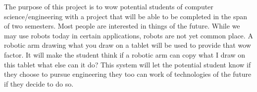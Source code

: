 The purpose of this project is to wow potential students of computer science/engineering with a project that will be able to be completed in the span of two semesters. Most people are interested in things of the future. While we may use robots today in certain applications, robots are not yet common place. A robotic arm drawing what you draw on a tablet will be used to provide that wow factor. It will make the student think if a robotic arm can copy what I draw on this tablet what else can it do? This system will let the potential student know if they choose to pursue engineering they too can work of technologies of the future if they decide to do so.